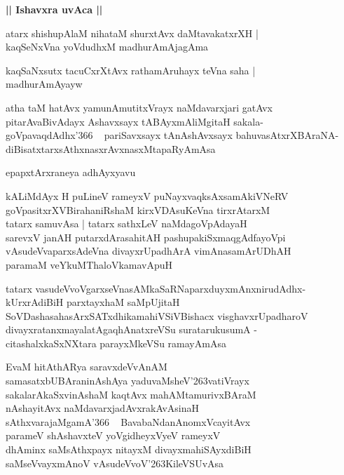 \documentclass[twoside,12pt,openright]{book}
\def\S{\char'263}
\newcounter{shloka}[chapter]
\def\uvaca#1{\centerline{{\large\textbf{#1}}}}
\begin{document}
\uvaca{|| Ishavxra uvAca ||}

\begin{shloka}%
atarx shishupAlaM nihataM shurxtAvx daMtavakatxrXH |\\
kaqSeNxVna yoVdudhxM madhurAmAjagAma 
\end{shloka}

\begin{shloka}%
kaqSaNxsutx tacuCxrXtAvx rathamAruhayx teVna saha |\\
madhurAmAyayw
\end{shloka}

\begin{shloka}%
atha taM hatAvx yamunAmutitxVrayx naMdavarxjari gatAvx \\
pitarAvaBivAdayx Ashavxsayx tABAyxmAliMgitaH sakala-\\
goVpavaqdAdhx\char'366 ~ pariSavxsayx tAnAshAvxsayx bahuvasAtxrXBAraNA-\\
diBisatxtarxsAthxnasxrAvxnasxMtapaRyAmAsa
\end{shloka}

\begin{center}
epapxtArxraneya adhAyxyavu
\end{center}

\begin{shloka}%
kALiMdAyx H puLineV rameyxV puNayxvaqksAxsamAkiVNeRV \\
goVpasitxrXVBirahaniRshaM kirxVDAsuKeVna tirxrAtarxM \\
tatarx samuvAsa | tatarx sathxLeV naMdagoVpAdayaH \\
sarevxV janAH putarxdArasahitAH pashupakiSxmaqgAdfayoVpi \\
vAsudeVvaparxsAdeVna divayxrUpadhArA vimAnasamArUDhAH \\
paramaM veYkuMThaloVkamavApuH
\end{shloka}

\begin{shloka}%
tatarx vasudeVvoVgarxseVnasAMkaSaRNaparxduyxmAnxnirudAdhx-\\
kUrxrAdiBiH parxtayxhaM saMpUjitaH \\
SoVDashasahasArxSATxdhikamahiVSiVBishacx visghavxrUpadharoV \\
divayxratanxmayalatAgaqhAnatxreVSu suratarukusumA -\\
citashalxkaSxNXtara parayxMkeVSu ramayAmAsa
\end{shloka}

\begin{shloka}%
EvaM hitAthARya saravxdeVvAnAM \\
samasatxbUBAraninAshAya yaduvaMsheV\S vatiVrayx \\
sakalarAkaSxvinAshaM kaqtAvx mahAMtamurivxBAraM \\
nAshayitAvx naMdavarxjadAvxrakAvAsinaH \\
sAthxvarajaMgamA\char'366 ~ BavabaNdanAnomxVcayitAvx \\
parameV shAshavxteV yoVgidheyxVyeV rameyxV \\
dhAminx saMsAthxpayx nitayxM divayxmahiSAyxdiBiH \\
saMseVvayxmAnoV vAsudeVvoV\S KileVSUvAsa
\end{shloka}
\end{document}

